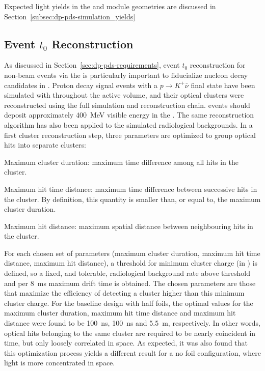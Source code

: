 Expected  light yields in the  and   module geometries are discussed in Section~\ref{subsec:dp-pds-simulation_yields}


\subsection{Event $t_{0}$ Reconstruction}
\label{subsec:dp-pds-performance_t0}

As discussed in Section~\ref{sec:dp-pds-requirements}, event $t_0$ reconstruction for non-beam events via the  is particularly important to fiducialize nucleon decay candidates in . Proton decay signal events with a %
$p\rightarrow K^{+} \bar\nu$ final state have been simulated with  \cite{Andreopoulos:2009rq} throughout the   active volume, and their optical clusters were reconstructed using the full simulation and reconstruction chain.  events should deposit approximately \SI{400}{\MeV} visible energy in the \lar. The same reconstruction algorithm has also been applied to the simulated radiological backgrounds. In a first cluster reconstruction step, three parameters are optimized to group optical hits into separate clusters:
%
\begin{description}
\item Maximum cluster duration:  maximum time difference among all  hits in the cluster.
\item Maximum hit time distance:  maximum time difference between successive  hits in the cluster. By definition, this quantity is smaller than, or equal to, the maximum cluster duration.
\item Maximum hit distance:  maximum spatial distance between neighbouring  hits in the cluster. 
\end{description}

For each chosen set of parameters (maximum cluster duration, maximum hit time distance, maximum hit distance), a threshold for minimum cluster charge (in ) is defined, so a fixed, and tolerable, radiological background rate above threshold and per \SI{8}{\milli\s} maximum drift time is obtained. The chosen parameters are those that maximize the efficiency of detecting a  cluster higher than this minimum cluster charge. For the  baseline design with half foils, the optimal values for the maximum cluster duration, maximum hit time distance and maximum hit distance were found to be \SI{100}{\ns}, \SI{100}{\ns} and \SI{5.5}{\m}, respectively. In other words, optical hits belonging to the same cluster are required to be nearly coincident in time, but only loosely correlated in space. As expected, it was also found that this optimization process yields a different result for a no foil  configuration, where light is more concentrated in space. 

